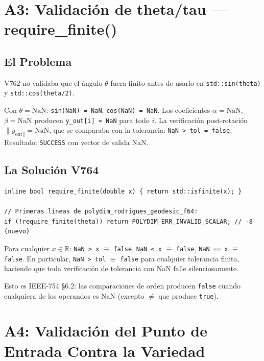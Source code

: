 \section{A3: Validación de theta/tau --- require\_finite()}

\subsection{El Problema}

V762 no validaba que el ángulo $\theta$ fuera finito antes de usarlo en
\texttt{std::sin(theta)} y \texttt{std::cos(theta/2)}.

Con $\theta = \text{NaN}$: \texttt{sin(NaN) = NaN}, \texttt{cos(NaN) = NaN}.
Los coeficientes $\alpha = \text{NaN}$, $\beta = \text{NaN}$ producen
\texttt{y\_out[i] = NaN} para todo $i$. La verificación post-rotación
$\|{y_{\text{out}\|}} = \text{NaN}$, que se comparaba con la tolerancia:
\texttt{NaN > tol = false}. Resultado: \texttt{SUCCESS} con vector de salida NaN.

\subsection{La Solución V764}

\begin{verbatim}
inline bool require_finite(double x) { return std::isfinite(x); }

// Primeras líneas de polydim_rodrigues_geodesic_f64:
if (!require_finite(theta)) return POLYDIM_ERR_INVALID_SCALAR; // -8 (nuevo)
\end{verbatim}

\begin{proposition}
Para cualquier $x \in \mathbb{R}$: \texttt{NaN > x} $\equiv$ \texttt{false},
\texttt{NaN < x} $\equiv$ \texttt{false}, \texttt{NaN == x} $\equiv$ \texttt{false}.
En particular, \texttt{NaN > tol} $\equiv$ \texttt{false} para cualquier tolerancia finita,
haciendo que toda verificación de tolerancia con NaN falle silenciosamente.
\end{proposition}

Esto es IEEE-754 §6.2: las comparaciones de orden producen \texttt{false} cuando
cualquiera de los operandos es NaN (excepto $\ne$ que produce \texttt{true}).

\section{A4: Validación del Punto de Entrada Contra la Variedad}

